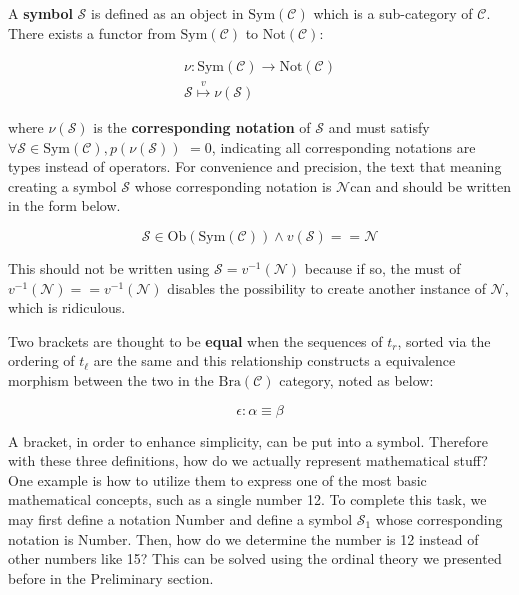 \documentclass[preprint]{elsarticle}
\numberwithin{theorem}{section}	%
\numberwithin{axiom}{section}	%
\numberwithin{definition}{section}	%
\begin{document}
\begin{definition}
	A \textbf{ symbol} \(\mathcal{S}\) is defined as an object in \(\text{Sym}(\mathcal{C})\) which is a sub-category of \(\mathcal{C}\). There exists a functor from \(\text{Sym}(\mathcal{C})\) to \(\text{Not}(\mathcal{C})\):
	
	\begin{equation}
		\begin{gathered}
			\nu :\text{Sym}(\mathcal{C})\to \text{Not}(\mathcal{C})\\
			\mathcal{S}\overset{\mathit{v}}{\mapsto }\nu (\mathcal{S})
		\end{gathered}
	\end{equation}
	
	\noindent where \(\nu (\mathcal{S})\) is the \textbf{ corresponding notation} of \(\mathcal{S}\) and must satisfy \(\forall \mathcal{S}\in \text{Sym}(\mathcal{C}),\mathit{p}(\nu (\mathcal{S}))\) \(= 0\), indicating all corresponding notations are types instead of operators. For convenience and precision, the text that meaning creating a symbol \(\mathcal{S}\) whose corresponding notation is \(\mathcal{N}\)can and should be written in the form below.
	
	\begin{equation}
		\mathcal{S}\in \text{Ob}(\text{Sym}(\mathcal{C}))\land \mathit{v}(\mathcal{S})==\mathcal{N}
	\end{equation}
	
	This should not be written using \(\mathcal{S}=\mathit{v}^{-1}(\mathcal{N})\) because if so, the must of \(\mathit{v}^{-1}(\mathcal{N})==\mathit{v}^{-1}(\mathcal{N})\) disables the possibility to create another instance of \(\mathcal{N}\), which is ridiculous. 
	
	Two brackets are thought to be \textbf{ equal} when the sequences of \(t_{\mathit{r}}\), sorted via the ordering of \(t_{\ell }\) are the same and this relationship constructs a equivalence morphism between the two in the \(\text{Bra}(\mathcal{C})\) category, noted as below:
	
	\begin{equation}
		\epsilon :\alpha \equiv \beta
	\end{equation}
\end{definition}

A bracket, in order to enhance simplicity, can be put into a symbol. Therefore with these three definitions, how do we actually represent mathematical stuff? One example is how to utilize them to express one of the most basic mathematical concepts, such as a single number 12. To complete this task, we may first define a notation Number and define a symbol \(\mathcal{S}_1\) whose corresponding notation is Number. Then, how do we determine the number is 12 instead of other numbers like 15? This can be solved using the ordinal theory we presented before in the Preliminary section.
\end{document}
